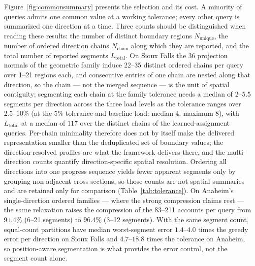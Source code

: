 Figure~\ref{fig:commonsummary} presents the selection and its cost. A
minority of queries admits one common value at a working tolerance;
every other query is summarized one direction at a time. Three counts
should be distinguished when reading these results: the number of
distinct boundary regions $N_{\mathrm{unique}}$, the number of ordered
direction chains $N_{\mathrm{chain}}$ along which they are reported,
and the total number of reported segments $L_{\mathrm{total}}$. On
Sioux Falls the 36 projection normals of the geometric family induce
22--35 distinct ordered chains per query over 1--21 regions each, and
consecutive entries of one chain are nested along that
direction, so the chain --- not the merged sequence --- is the unit of
spatial contiguity; segmenting each chain at the family tolerance
needs a median of $2$--$5.5$ segments per direction across the three
load levels as the tolerance ranges over $2.5$--$10\%$ (at the $5\%$
tolerance and baseline load: median $4$, maximum $8$), with
$L_{\mathrm{total}}$ at a median of $117$ over the distinct chains of
the learned-assignment queries. Per-chain minimality therefore does
not by itself make the delivered representation smaller than the
deduplicated set of boundary values; the direction-resolved profiles
are what the framework delivers there, and the multi-direction counts
quantify direction-specific spatial resolution. Ordering all
directions into one progress sequence yields fewer apparent segments
only by grouping non-adjacent cross-sections, so those counts are not
spatial summaries and are retained only for comparison
(Table~\ref{tab:tolerance}). On Anaheim's single-direction ordered
families --- where the strong compression claims rest --- the same
relaxation raises the compression of the 83--211 accounts
per query from $91.4\%$ (6--21 segments) to $96.4\%$ (3--12
segments). With the same segment count, equal-count partitions have
median worst-segment error $1.4$--$4.0$ times the greedy error per
direction on Sioux Falls and $4.7$--$18.8$ times the tolerance on
Anaheim, so position-aware segmentation is what provides the error
control, not the segment count alone.

